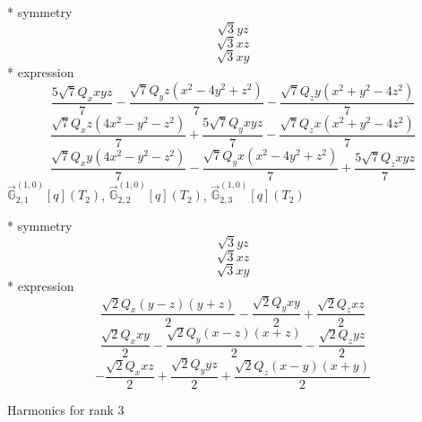 \documentclass[fleqn,8pt]{jsarticle}
\begin{document}
\noindent\quad ** symmetry
\begin{dmath*}
\sqrt{3} y z
\end{dmath*}
\begin{dmath*}
\sqrt{3} x z
\end{dmath*}
\begin{dmath*}
\sqrt{3} x y
\end{dmath*}
\noindent\quad ** expression
\begin{dmath*}
\frac{5 \sqrt{7} Q_{x} x y z}{7} - \frac{\sqrt{7} Q_{y} z \left(x^{2} - 4 y^{2} + z^{2}\right)}{7} - \frac{\sqrt{7} Q_{z} y \left(x^{2} + y^{2} - 4 z^{2}\right)}{7}
\end{dmath*}
\begin{dmath*}
\frac{\sqrt{7} Q_{x} z \left(4 x^{2} - y^{2} - z^{2}\right)}{7} + \frac{5 \sqrt{7} Q_{y} x y z}{7} - \frac{\sqrt{7} Q_{z} x \left(x^{2} + y^{2} - 4 z^{2}\right)}{7}
\end{dmath*}
\begin{dmath*}
\frac{\sqrt{7} Q_{x} y \left(4 x^{2} - y^{2} - z^{2}\right)}{7} - \frac{\sqrt{7} Q_{y} x \left(x^{2} - 4 y^{2} + z^{2}\right)}{7} + \frac{5 \sqrt{7} Q_{z} x y z}{7}
\end{dmath*}
\noindent\quad $\vec{\mathbb{G}}_{2,1}^{(1,0)}[q](T_{2})$, $\vec{\mathbb{G}}_{2,2}^{(1,0)}[q](T_{2})$, $\vec{\mathbb{G}}_{2,3}^{(1,0)}[q](T_{2})$

\noindent\quad ** symmetry
\begin{dmath*}
\sqrt{3} y z
\end{dmath*}
\begin{dmath*}
\sqrt{3} x z
\end{dmath*}
\begin{dmath*}
\sqrt{3} x y
\end{dmath*}
\noindent\quad ** expression
\begin{dmath*}
\frac{\sqrt{2} Q_{x} \left(y - z\right) \left(y + z\right)}{2} - \frac{\sqrt{2} Q_{y} x y}{2} + \frac{\sqrt{2} Q_{z} x z}{2}
\end{dmath*}
\begin{dmath*}
\frac{\sqrt{2} Q_{x} x y}{2} - \frac{\sqrt{2} Q_{y} \left(x - z\right) \left(x + z\right)}{2} - \frac{\sqrt{2} Q_{z} y z}{2}
\end{dmath*}
\begin{dmath*}
- \frac{\sqrt{2} Q_{x} x z}{2} + \frac{\sqrt{2} Q_{y} y z}{2} + \frac{\sqrt{2} Q_{z} \left(x - y\right) \left(x + y\right)}{2}
\end{dmath*}

\noindent * Harmonics for rank 3
\end{document}
